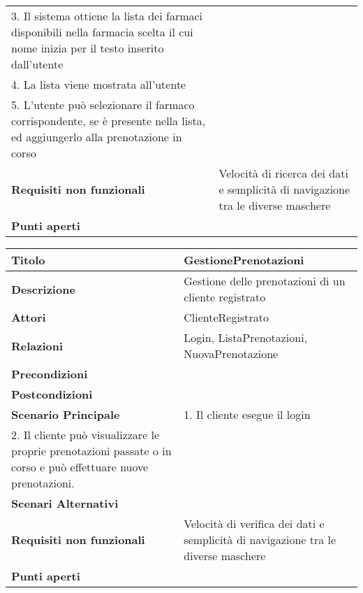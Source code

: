 \begin{tabular} {|P{4.5cm}|P{12.5cm}|}
        3. Il sistema ottiene la lista dei farmaci disponibili nella farmacia scelta il cui nome inizia per il testo inserito dall'utente \\ 
        4. La lista viene mostrata all'utente \\ 
        5. L'utente può selezionare il farmaco corrispondente, se è presente nella lista, ed aggiungerlo alla prenotazione in corso \\
  \hline
    \textbf{Requisiti non funzionali} & Velocità di ricerca dei dati e semplicità di navigazione tra le diverse maschere\\
  \hline
    \textbf{Punti aperti} &\\
  \hline
\end{tabular}
\hfill
\break

\begin{tabular} {|P{4.5cm}|P{12.5cm}|}\hline
  \textbf{Titolo} & GestionePrenotazioni\\
  \hline
    \textbf{Descrizione} & Gestione delle prenotazioni di un cliente registrato\\
  \hline
    \textbf{Attori} & ClienteRegistrato\\
  \hline
    \textbf{Relazioni} & Login, ListaPrenotazioni, NuovaPrenotazione\\
  \hline
    \textbf{Precondizioni} &\\
  \hline
    \textbf{Postcondizioni} &\\
  \hline
    \textbf{Scenario Principale} & 1. Il cliente esegue il login \\ 2. Il cliente può visualizzare le proprie prenotazioni passate o in corso e può effettuare nuove prenotazioni.\\
  \hline
    \textbf{Scenari Alternativi} &\\
  \hline
    \textbf{Requisiti non funzionali} & Velocità di verifica dei dati e semplicità di navigazione tra le diverse maschere\\
  \hline
    \textbf{Punti aperti} &\\
  \hline
\end{tabular}
\hfill
\break

